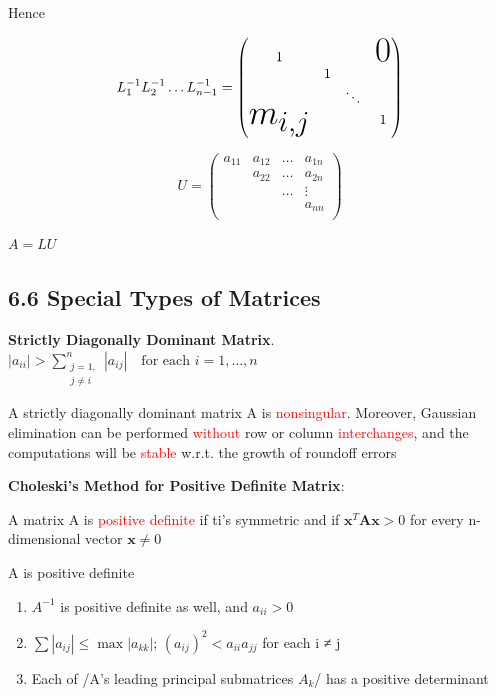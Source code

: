 \documentclass[11pt]{article}
\begin{document}
    Hence 

    \begin{equation*}
      L_1^{-1}L_2^{-1}\dots L_{n-1}^{-1}=
      \begin{pmatrix}
        1&&&\mbox{\Huge 0}\\
        &1&&\\
        &&\ddots&\\
        \text{\Huge $m_{i,j}$}&&&1\\
      \end{pmatrix}
    \end{equation*}

    \begin{equation*}
      U=
      \begin{pmatrix}
        a_{11}&a_{12}&\dots&a_{1n}\\
        &a_{22}&\dots&a_{2n}\\
        &&\dots&\vdots\\
        &&&a_{nn}\\
      \end{pmatrix}
    \end{equation*}

    \(A=LU\)
    \subsection{6.6 Special Types of Matrices}
    \label{sec:org0a821ff}
    \textbf{Strictly Diagonally Dominant Matrix}.
    \(|a_{ii}|>\displaystyle\sum_{\substack{j=1,\\j\neq i}}^n|a_{ij}| \quad
    \text{for each } i=1,\dots,n\)

    \begin{theorem}
      A strictly diagonally dominant matrix A is \textcolor{red}{nonsingular}. Moreover,
      Gaussian elimination can be performed \textcolor{red}{without} row or column
      \textcolor{red}{interchanges}, and the computations will be \textcolor{red}{stable}
      w.r.t. the growth of roundoff errors
    \end{theorem}

    \textbf{Choleski's Method for Positive Definite Matrix}:
    \begin{definition}
      A matrix A is \textcolor{red}{positive definite} if ti's symmetric and if    
      $ \mathbf{x}^T \mathbf{A} \mathbf{x}>0$ for every n-dimensional vector $ \mathbf{x}\neq 0$
    \end{definition}

    \begin{lemma}
      A is positive definite
      \begin{enumerate}
      \item $A^{-1}$ is positive definite as well, and $a_{ii}>0$
      \item $\sum|a_{ij}|\le\max|a_{kk}|$; $(a_{ij})^2<a_{ii}a_{jj}$ for each i ≠ j
      \item Each of /A's leading principal submatrices $A_k$/ has a positive determinant
      \end{enumerate}
    \end{lemma}
\end{document}
